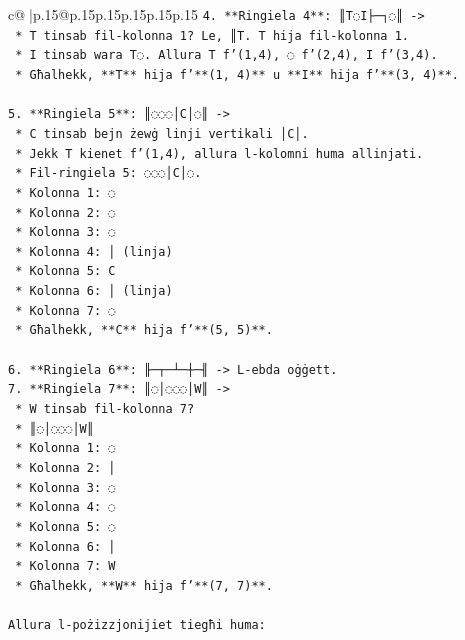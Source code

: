 \documentclass{article}
\begin{document}
{\begin{supertabular}{c@{$\;$}|p{.15\linewidth}@{}p{.15\linewidth}p{.15\linewidth}p{.15\linewidth}p{.15\linewidth}p{.15\linewidth}}
{{{\texttt{4.  **Ringiela 4**: ║T◌I├─┐◌║ {-}>} \\
\texttt{    *   T tinsab fil{-}kolonna 1? Le, ║T. T hija fil{-}kolonna 1.} \\
\texttt{    *   I tinsab wara T◌. Allura T f'(1,4), ◌ f'(2,4), I f'(3,4).} \\
\texttt{    *   Għalhekk, **T** hija f'**(1, 4)** u **I** hija f'**(3, 4)**.} \\
\\ 
\texttt{5.  **Ringiela 5**: ║◌◌◌│C│◌║ {-}>} \\
\texttt{    *   C tinsab bejn żewġ linji vertikali │C│.} \\
\texttt{    *   Jekk T kienet f'(1,4), allura l{-}kolomni huma allinjati.} \\
\texttt{    *   Fil{-}ringiela 5: ◌◌◌│C│◌.} \\
\texttt{    *   Kolonna 1: ◌} \\
\texttt{    *   Kolonna 2: ◌} \\
\texttt{    *   Kolonna 3: ◌} \\
\texttt{    *   Kolonna 4: │ (linja)} \\
\texttt{    *   Kolonna 5: C} \\
\texttt{    *   Kolonna 6: │ (linja)} \\
\texttt{    *   Kolonna 7: ◌} \\
\texttt{    *   Għalhekk, **C** hija f'**(5, 5)**.} \\
\\ 
\texttt{6.  **Ringiela 6**: ╟─┬─┴─┼─╢ {-}> L{-}ebda oġġett.} \\
\texttt{7.  **Ringiela 7**: ║◌│◌◌◌│W║ {-}>} \\
\texttt{    *   W tinsab fil{-}kolonna 7?} \\
\texttt{    *   ║◌│◌◌◌│W║} \\
\texttt{    *   Kolonna 1: ◌} \\
\texttt{    *   Kolonna 2: │} \\
\texttt{    *   Kolonna 3: ◌} \\
\texttt{    *   Kolonna 4: ◌} \\
\texttt{    *   Kolonna 5: ◌} \\
\texttt{    *   Kolonna 6: │} \\
\texttt{    *   Kolonna 7: W} \\
\texttt{    *   Għalhekk, **W** hija f'**(7, 7)**.} \\
\\ 
\texttt{Allura l{-}pożizzjonijiet tiegħi huma:} \\
}}}
\end{supertabular}}
\end{document}
